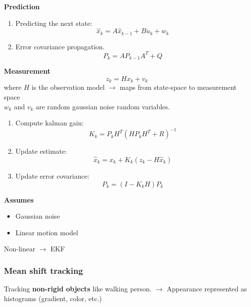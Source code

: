 \documentclass[a4paper]{article}
\begin{document}
\textbf{Prediction} 
\begin{enumerate}
	\item Predicting the next state: \begin{equation} \hat{x}_k = A \hat{x}_{k-1} + B u_k + w_k \end{equation}
	\item Error covariance propagation. \begin{equation} P_k = A P_{k-1} A^{T} + Q \end{equation}
\end{enumerate}



\textbf{Measurement} 
\begin{equation}
	z_k = H x_k + v_k
\end{equation}
where $ H $ is the observation model $ \rightarrow $ maps from state-space to measurement space\\
$ w_k $ and  $ v_k $ are random gaussian noise random variables.

\begin{enumerate}
	\item Compute kalman gain:
		\begin{equation}
			K_k = P_k H^{T}(H P_k H^{T} + R )^{-1}   
		\end{equation}
	\item Update estimate:
		\begin{equation}
		\hat{x}_k = \hat{x}_k + K_k (z_k - H \hat{x}_k)
		\end{equation}
	\item Update error covariance:
		\begin{equation}
		P_k = (I - K_k H)P_k
		\end{equation}
\end{enumerate}


\textbf{Assumes} 
\begin{itemize}
	\item  Gaussian noise
	\item Linear motion model
\end{itemize}

Non-linear $ \rightarrow $  EKF



\subsubsection{Mean shift tracking}
Tracking \textbf{non-rigid objects } like walking person. $ \rightarrow $ Appearance represented as histograms (gradient, color, etc.)
\end{document}
